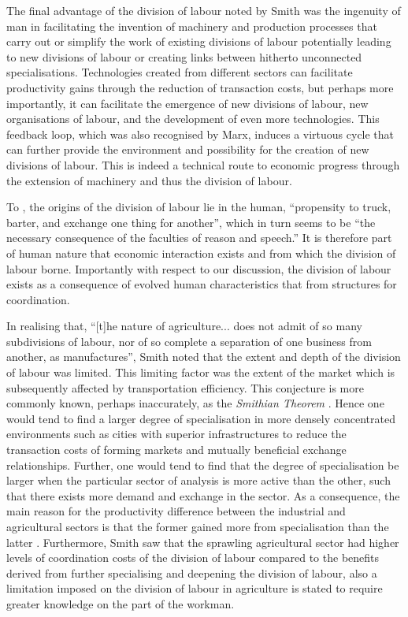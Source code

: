 The final advantage of the division of labour noted by Smith was the ingenuity of man in facilitating the invention of machinery and production processes that carry out or simplify the work of existing divisions of labour potentially leading to new divisions of labour or creating links between hitherto unconnected specialisations. Technologies created from different sectors can facilitate productivity gains through the reduction of transaction costs, but perhaps more importantly, it can facilitate the emergence of new divisions of labour, new organisations of labour, and the development of even more technologies. This feedback loop, which was also recognised by Marx, induces a virtuous cycle that can further provide the environment and possibility for the creation of new divisions of labour. This is indeed a technical route to economic progress through the extension of machinery and thus the division of labour.

To \citet[p.~13]{Smith1776}, the origins of the division of labour lie in the human, ``propensity to truck, barter, and exchange one thing for another'', which in turn seems to be ``the necessary consequence of the faculties of reason and speech.'' It is therefore part of human nature that economic interaction exists and from which the division of labour borne. Importantly with respect to our discussion, the division of labour exists as a consequence of evolved human characteristics that from structures for coordination.

In realising that, ``[t]he nature of agriculture... does not admit of so many subdivisions of labour, nor of so complete a separation of one business from another, as manufactures'', Smith noted that the extent and depth of the division of labour was limited. This limiting factor was the extent of the market which is subsequently affected by transportation efficiency. This conjecture is more commonly known, perhaps inaccurately, as the \textit{Smithian Theorem} \citep{Stigler1951}. Hence one would tend to find a larger degree of specialisation in more densely concentrated environments such as cities with superior infrastructures to reduce the transaction costs of forming markets and mutually beneficial exchange relationships. Further, one would tend to find that the degree of specialisation be larger when the particular sector of analysis is more active than the other, such that there exists more demand and exchange in the sector. As a consequence, the main reason for the productivity difference between the industrial and agricultural sectors is that the former gained more from specialisation than the latter \citep[p.~18]{Smith1776}. Furthermore, Smith saw that the sprawling agricultural sector had higher levels of coordination costs of the division of labour compared to the benefits derived from further specialising and deepening the division of labour, also a limitation imposed on the division of labour in agriculture is stated to require greater knowledge on the part of the workman.

